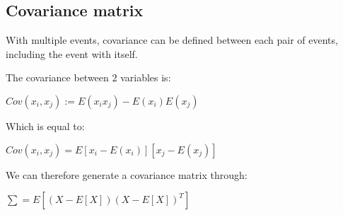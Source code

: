 
\subsection{Covariance matrix}

With multiple events, covariance can be defined between each pair of events, including the event with itself.

The covariance between \(2\) variables is:

$Cov(x_i,x_j):=E(x_ix_j)-E(x_i)E(x_j)$

Which is equal to:

$Cov(x_i,x_j)=E{[x_i-E(x_i)][x_j-E(x_j)]}$

We can therefore generate a covariance matrix through:

$\sum =E[(X-E[X])(X-E[X])^T]$

